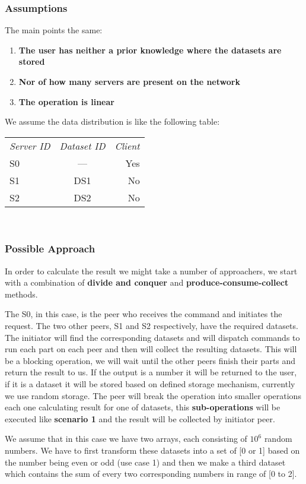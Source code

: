 \subsubsection{Assumptions}
The main points the same:
\begin{enumerate}
\item \textbf{The user has neither a prior knowledge where the datasets are stored}
\item \textbf{Nor of how many servers are present on the network}
\item \textbf{The operation is linear}
\end{enumerate}

We assume the data distribution is like the following table:

\begin{tabular}{ l c r }
\em{Server ID} & \em{ Dataset ID} & \em{ Client} \\
S0 & --- & Yes \\
S1 & DS1 & No \\
S2 & DS2 & No \\
\end{tabular}\\

\subsubsection{Possible Approach}
In order to calculate the result we might take a number of approachers, we start with a combination of \textbf{divide and conquer} and
\textbf{produce-consume-collect} methods.

The S0, in this case, is the peer who receives the command and initiates the request. The two other peers, S1 and S2 respectively, have the required
datasets. The initiator will find the corresponding datasets and will dispatch commands to run each part on each peer and then will collect
the resulting datasets. This will be a blocking operation, we will wait until the other peers finish their parts and return the result
to us. If the output is a number it will be returned to the user, if it is a dataset it will be stored based on defined storage mechanism, 
currently we use random storage. The peer will break the operation into smaller operations each one calculating result for one of datasets, 
this \textbf{sub-operations} will be executed like \textbf{scenario 1} and the result will be collected by initiator peer.

We assume that in this case we have two arrays, each consisting of \(10^6\) random numbers. We have to first transform these datasets into
a set of [0 or 1] based on the number being even or odd (use case 1) and then we make a third dataset which contains the sum of every two
corresponding numbers in range of [0 to 2].


